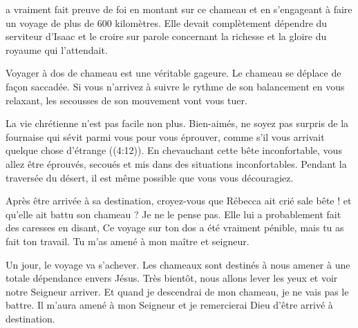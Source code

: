  a vraiment fait preuve de foi
 en montant sur ce chameau et en s'engageant à faire un voyage
 de plus de 600 kilomètres.
 Elle devait complètement dépendre du serviteur d'Isaac
 et le croire sur parole concernant la richesse
 et la gloire du royaume qui l'attendait. 

Voyager à dos de chameau est une véritable gageure.
 Le chameau se déplace de façon saccadée.
 Si vous n'arrivez à suivre le rythme de son balancement
 en vous relaxant, les secousses de son mouvement vont vous tuer.

La vie chrétienne n'est pas facile non plus.
 \og Bien-aimés, ne soyez pas surpris de la fournaise qui sévit
 parmi vous pour vous éprouver, comme s'il vous arrivait
 quelque chose d'étrange \fg{} ((4:12)).
 En chevauchant cette bête inconfortable, vous allez être éprouvés,
 secoués et mis dans des situations inconfortables.
 Pendant la traversée du désert,
 il est même possible que vous vous découragiez. 

Après être arrivée à sa destination,
 croyez-vous que Rébecca ait crié \og sale bête ! \fg{}
 et qu'elle ait battu son chameau ? Je ne le pense pas.
 Elle lui a probablement fait des caresses en disant,
 \og Ce voyage sur ton dos a été vraiment pénible,
 mais tu as fait ton travail. Tu m'as amené à mon maître et seigneur. \fg{}


Un jour, le voyage va s'achever. Les chameaux sont destinés à nous amener
 à une totale dépendance envers Jésus.
 Très bientôt, nous allons lever les yeux et voir notre Seigneur arriver.
 Et quand je descendrai de mon chameau, je ne vais pas le battre.
 Il m'aura amené à mon Seigneur et je remercierai Dieu
 d'être arrivé à destination. 

\dvrule






